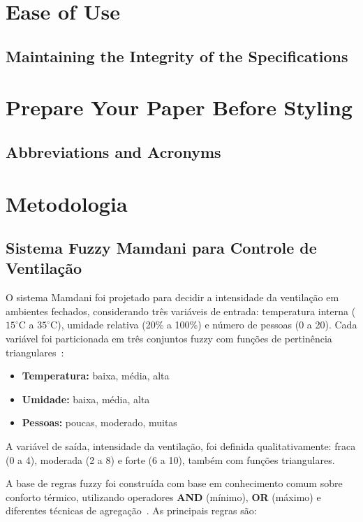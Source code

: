 \section{Ease of Use}

\subsection{Maintaining the Integrity of the Specifications}



\section{Prepare Your Paper Before Styling}


\subsection{Abbreviations and Acronyms}



\section{Metodologia}

\subsection{Sistema Fuzzy Mamdani para Controle de Ventilação}

O sistema Mamdani foi projetado para decidir a intensidade da ventilação em ambientes fechados, considerando três variáveis de entrada: temperatura interna ($15^\circ$C a $35^\circ$C), umidade relativa (20\% a 100\%) e número de pessoas (0 a 20). Cada variável foi particionada em três conjuntos fuzzy com funções de pertinência triangulares~\cite{ross2010fuzzy}:

\begin{itemize}
    \item \textbf{Temperatura:} baixa, média, alta
    \item \textbf{Umidade:} baixa, média, alta
    \item \textbf{Pessoas:} poucas, moderado, muitas
\end{itemize}

A variável de saída, intensidade da ventilação, foi definida qualitativamente: fraca (0 a 4), moderada (2 a 8) e forte (6 a 10), também com funções triangulares.

A base de regras fuzzy foi construída com base em conhecimento comum sobre conforto térmico, utilizando operadores \textbf{AND} (mínimo), \textbf{OR} (máximo) e diferentes técnicas de agregação~\cite{ross2010fuzzy}. As principais regras são:

